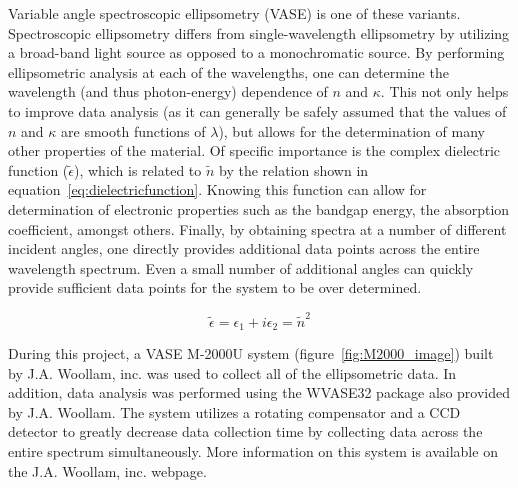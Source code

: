 Variable angle spectroscopic ellipsometry (VASE) is one of these variants. Spectroscopic ellipsometry differs from single-wavelength ellipsometry by utilizing a broad-band light source as opposed to a monochromatic source. By performing ellipsometric analysis at each of the wavelengths, one can determine the wavelength (and thus photon-energy) dependence of $n$ and $\kappa$. This not only helps to improve data analysis (as it can generally be safely assumed that the values of $n$ and $\kappa$ are smooth functions of $\lambda$), but allows for the determination of many other properties of the material. Of specific importance is the complex dielectric function ($\tilde{\epsilon}$), which is related to $\tilde{n}$ by the relation shown in equation~\vref{eq:dielectricfunction}. Knowing this function can allow for determination of electronic properties such as the bandgap energy, the absorption coefficient, amongst others. Finally, by obtaining spectra at a number of different incident angles, one directly provides additional data points across the entire wavelength spectrum. Even a small number of additional angles can quickly provide sufficient data points for the system to be over determined. 

\begin{equation}
 \label{eq:dielectricfunction}
 \displaystyle
	\tilde{\epsilon} = \epsilon_{1} + i\epsilon_{2} = \tilde{n}^{2}
\end{equation}

During this project, a VASE M-2000U system (figure~\vref{fig:M2000_image}) built by J.A. Woollam, inc. was used to collect all of the ellipsometric data. In addition, data analysis was performed using the WVASE32 package also provided by J.A. Woollam. The system utilizes a rotating compensator and a CCD detector to greatly decrease data collection time by collecting data across the entire spectrum simultaneously.  More information on this system is available on the J.A. Woollam, inc. webpage.\cite{woollam-web}

